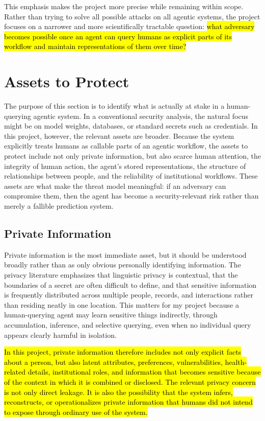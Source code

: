 \documentclass[11pt]{article}
\begin{document}
This emphasis makes the project more precise while remaining within scope. Rather than trying to solve all possible attacks on all agentic systems, the project focuses on a narrower and more scientifically tractable question: \hl{what adversary becomes possible once an agent can query humans as explicit parts of its workflow and maintain representations of them over time?}

\section{Assets to Protect}

The purpose of this section is to identify what is actually at stake in a human-querying agentic system. In a conventional security analysis, the natural focus might be on model weights, databases, or standard secrets such as credentials. In this project, however, the relevant assets are broader. Because the system explicitly treats humans as callable parts of an agentic workflow, the assets to protect include not only private information, but also scarce human attention, the integrity of human action, the agent's stored representations, the structure of relationships between people, and the reliability of institutional workflows. These assets are what make the threat model meaningful: if an adversary can compromise them, then the agent has become a security-relevant risk rather than merely a fallible prediction system.

\subsection{Private Information}

Private information is the most immediate asset, but it should be understood broadly rather than as only obvious personally identifying information. The privacy literature emphasizes that linguistic privacy is contextual, that the boundaries of a secret are often difficult to define, and that sensitive information is frequently distributed across multiple people, records, and interactions rather than residing neatly in one location. This matters for my project because a human-querying agent may learn sensitive things indirectly, through accumulation, inference, and selective querying, even when no individual query appears clearly harmful in isolation. \citep{brown2022privacylm,nissenbaum2009contextualintegrity}

\hl{In this project, private information therefore includes not only explicit facts about a person, but also latent attributes, preferences, vulnerabilities, health-related details, institutional roles, and information that becomes sensitive because of the context in which it is combined or disclosed. The relevant privacy concern is not only direct leakage. It is also the possibility that the system infers, reconstructs, or operationalizes private information that humans did not intend to expose through ordinary use of the system.}
\end{document}
